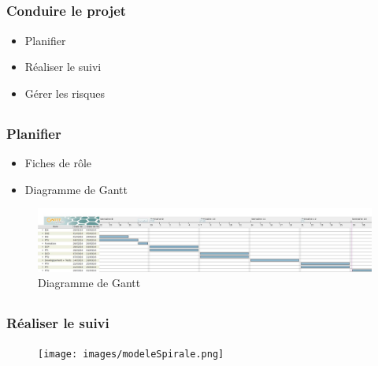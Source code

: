 \subsection{} %

\begin{frame}
\frametitle{Conduire le projet}
	\begin{itemize}
		\item Planifier
		\item Réaliser le suivi
		\item Gérer les risques
	\end{itemize}
\end{frame}

\subsection{}

\begin{frame}
\frametitle{Planifier}
\begin{itemize}
	\item Fiches de rôle
	\item Diagramme de Gantt
\end{itemize}
\begin{figure}
	\includegraphics[scale=0.15]{images/exempleGantt.jpg}
	\caption{Diagramme de Gantt}
	\label{DG}
\end{figure}
\end{frame}

\subsection{}

\begin{frame}
\frametitle{Réaliser le suivi}
\begin{figure}
\texttt{[image: images/modeleSpirale.png]}
\end{figure}
\end{frame}